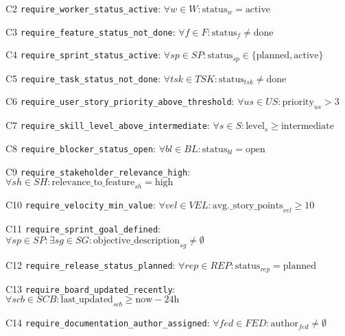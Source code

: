 \documentclass[12pt]{article}
\begin{document}
    \item[C2] \texttt{require\_worker\_status\_active}: 
    $\forall w \in W: \text{status}_w = \text{active}$
    
    \item[C3] \texttt{require\_feature\_status\_not\_done}: 
    $\forall f \in F: \text{status}_f \neq \text{done}$
    
    \item[C4] \texttt{require\_sprint\_status\_active}: 
    $\forall sp \in SP: \text{status}_{sp} \in \{\text{planned}, \text{active}\}$
    
    \item[C5] \texttt{require\_task\_status\_not\_done}: 
    $\forall tsk \in TSK: \text{status}_{tsk} \neq \text{done}$
    
    \item[C6] \texttt{require\_user\_story\_priority\_above\_threshold}: 
    $\forall us \in US: \text{priority}_{us} > 3$
    
    \item[C7] \texttt{require\_skill\_level\_above\_intermediate}: 
    $\forall s \in S: \text{level}_s \geq \text{intermediate}$
    
    \item[C8] \texttt{require\_blocker\_status\_open}: 
    $\forall bl \in BL: \text{status}_{bl} = \text{open}$
    
    \item[C9] \texttt{require\_stakeholder\_relevance\_high}: 
    $\forall sh \in SH: \text{relevance\_to\_feature}_{sh} = \text{high}$
    
    \item[C10] \texttt{require\_velocity\_min\_value}: 
    $\forall vel \in VEL: \text{avg.\_story\_points}_{vel} \geq 10$
    
    \item[C11] \texttt{require\_sprint\_goal\_defined}: 
    $\forall sp \in SP: \exists sg \in SG: \text{objective\_description}_{sg} \neq \emptyset$
    
    \item[C12] \texttt{require\_release\_status\_planned}: 
    $\forall rep \in REP: \text{status}_{rep} = \text{planned}$
    
    \item[C13] \texttt{require\_board\_updated\_recently}: 
    $\forall scb \in SCB: \text{last\_updated}_{scb} \geq \text{now} - 24\text{h}$
    
    \item[C14] \texttt{require\_documentation\_author\_assigned}: 
    $\forall fed \in FED: \text{author}_{fed} \neq \emptyset$
\end{document}

